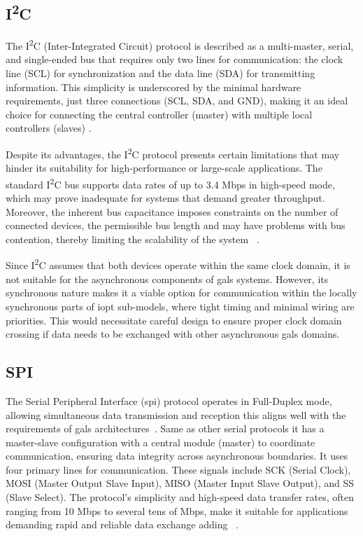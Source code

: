 \subsection{I\textsuperscript{2}C}
\label{subsub:i2c}

The I\textsuperscript{2}C  (Inter-Integrated Circuit) protocol is described as a multi-master, serial, and single-ended bus that requires only two lines for communication: the clock line (SCL) for synchronization and the data line (SDA) for transmitting information. This simplicity is underscored by the minimal hardware requirements, just three connections (SCL, SDA, and GND), making it an ideal choice for connecting the central controller (master) with multiple local controllers (slaves) \cite{i2c}.

Despite its advantages, the I\textsuperscript{2}C  protocol presents certain limitations that may hinder its suitability for high-performance or large-scale applications. The standard I\textsuperscript{2}C bus supports data rates of up to 3.4 Mbps in high-speed mode, which may prove inadequate for systems that demand greater throughput. Moreover, the inherent bus capacitance imposes constraints on the number of connected devices, the permissible bus length and may have problems with bus contention, thereby limiting the scalability of the system ~\cite{I2Cv2}.

Since I\textsuperscript{2}C assumes that both devices operate within the same clock domain, it is not suitable for the asynchronous components of \gls{gals} systems. However, its synchronous nature makes it a viable option for communication within the locally synchronous parts of \gls{iopt} sub-models, where tight timing and minimal wiring are priorities. This would necessitate careful design to ensure proper clock domain crossing if data needs to be exchanged with other asynchronous \gls{gals} domains.

\subsection{SPI}
\label{subsub:spi}

The Serial Peripheral Interface (\gls{spi}) protocol operates in Full-Duplex mode, allowing simultaneous data transmission and reception this aligns well with the requirements of \gls{gals} architectures~\cite{spisite}. Same as other serial protocols it has a master-slave configuration with a central module (master) to coordinate communication, ensuring data integrity across asynchronous boundaries. It uses four primary lines for communication. These signals include SCK (Serial Clock), MOSI (Master Output Slave Input), MISO (Master Input Slave Output), and SS (Slave Select). The protocol's simplicity and high-speed data transfer rates, often ranging from 10 Mbps to several tens of Mbps, make it suitable for applications demanding rapid and reliable data exchange adding ~\cite{spisite}.

